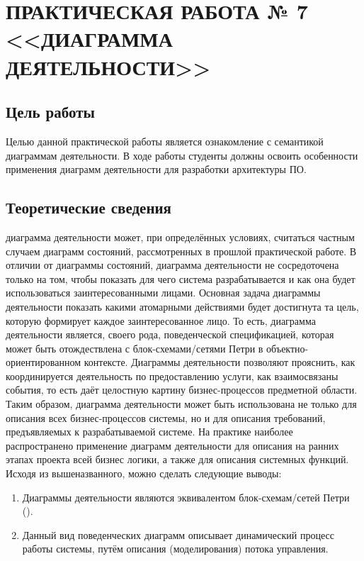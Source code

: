 \chapter{ПРАКТИЧЕСКАЯ РАБОТА № 7 <<ДИАГРАММА ДЕЯТЕЛЬНОСТИ>>}

\section{Цель работы}
Целью данной практической работы является ознакомление с семантикой диаграммам деятельности. В ходе работы студенты должны освоить особенности применения диаграмм деятельности для разработки архитектуры ПО.

\section{Теоретические сведения}

диаграмма деятельности может, при определённых условиях, считаться частным случаем диаграмм состояний, рассмотренных в прошлой практической работе. В отличии от диаграммы состояний, диаграмма деятельности не сосредоточена только на том, чтобы показать для чего система разрабатывается и как она будет использоваться заинтересованными лицами. Основная задача диаграммы деятельности показать какими атомарными действиями будет достигнута та цель, которую формирует каждое заинтересованное лицо. То есть, диаграмма деятельности является, своего рода, поведенческой спецификацией, которая может быть отождествлена с  блок-схемами/сетями Петри в объектно-ориентированном контексте. Диаграммы деятельности позволяют прояснить, как координируется деятельность по предоставлению услуги, как взаимосвязаны события, то есть даёт целостную картину бизнес-процессов предметной области. Таким образом, диаграмма деятельности может быть использована не только для описания всех бизнес-процессов системы, но и для описания требований, предъявляемых к разрабатываемой системе.
На практике наиболее распространено применение диаграмм деятельности для описания на ранних этапах проекта всей бизнес логики, а также для описания системных функций.
Исходя из вышеназванного, можно сделать следующие выводы:
\begin{enumerate}
	\item{ Диаграммы деятельности являются эквивалентом блок-схемам/сетей Петри ().}
	\item{ Данный вид поведенческих диаграмм описывает динамический процесс работы системы, путём описания (моделирования) потока управления.}
\end{enumerate}

